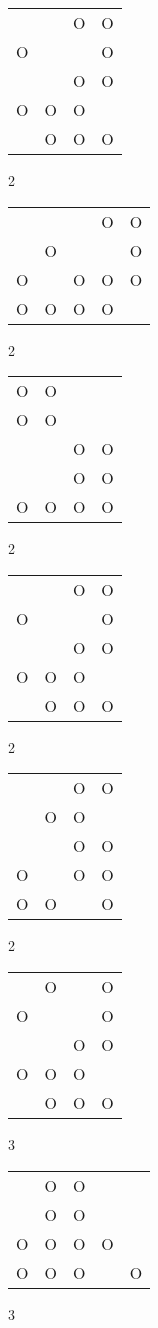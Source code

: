 \begin{tabular}{|m{0.2cm}m{0.2cm}m{0.2cm}m{0.2cm}|}\hline
 & &O&O\\
O& & &O\\
 & &O&O\\
O&O&O& \\
 &O&O&O\\
\hline\end{tabular}2
\begin{tabular}{|m{0.2cm}m{0.2cm}m{0.2cm}m{0.2cm}m{0.2cm}|}\hline
 & & &O&O\\
 &O& & &O\\
O& &O&O&O\\
O&O&O&O& \\
\hline\end{tabular}2
\begin{tabular}{|m{0.2cm}m{0.2cm}m{0.2cm}m{0.2cm}|}\hline
O&O& & \\
O&O& & \\
 & &O&O\\
 & &O&O\\
O&O&O&O\\
\hline\end{tabular}2
\begin{tabular}{|m{0.2cm}m{0.2cm}m{0.2cm}m{0.2cm}|}\hline
 & &O&O\\
O& & &O\\
 & &O&O\\
O&O&O& \\
 &O&O&O\\
\hline\end{tabular}2
\begin{tabular}{|m{0.2cm}m{0.2cm}m{0.2cm}m{0.2cm}|}\hline
 & &O&O\\
 &O&O& \\
 & &O&O\\
O& &O&O\\
O&O& &O\\
\hline\end{tabular}2
\begin{tabular}{|m{0.2cm}m{0.2cm}m{0.2cm}m{0.2cm}|}\hline
 &O& &O\\
O& & &O\\
 & &O&O\\
O&O&O& \\
 &O&O&O\\
\hline\end{tabular}3
\begin{tabular}{|m{0.2cm}m{0.2cm}m{0.2cm}m{0.2cm}m{0.2cm}|}\hline
 &O&O& & \\
 &O&O& & \\
O&O&O&O& \\
O&O&O& &O\\
\hline\end{tabular}3

